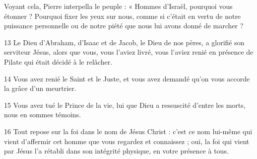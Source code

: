 Voyant cela, Pierre interpella le peuple : « Hommes d’Israël, pourquoi vous étonner ? Pourquoi fixer les yeux sur nous, comme si c’était en vertu de notre puissance personnelle ou de notre piété que nous lui avons donné de marcher ?

13 Le Dieu d’Abraham, d’Isaac et de Jacob, le Dieu de nos pères, a glorifié son serviteur Jésus, alors que vous, vous l’aviez livré, vous l’aviez renié en présence de Pilate qui était décidé à le relâcher.

14 Vous avez renié le Saint et le Juste, et vous avez demandé qu’on vous accorde la grâce d’un meurtrier.

15 Vous avez tué le Prince de la vie, lui que Dieu a ressuscité d’entre les morts, nous en sommes témoins.

16 Tout repose sur la foi dans le nom de Jésus Christ : c’est ce nom lui-même qui vient d’affermir cet homme que vous regardez et connaissez ; oui, la foi qui vient par Jésus l’a rétabli dans son intégrité physique, en votre présence à tous.
